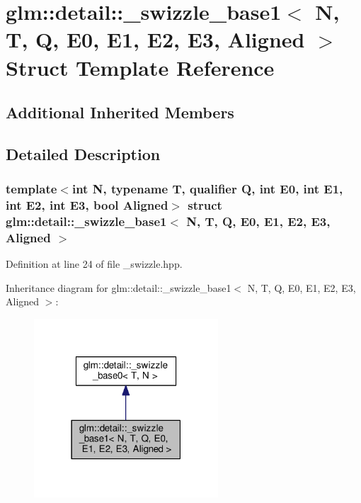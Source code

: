 \hypertarget{structglm_1_1detail_1_1__swizzle__base1}{}\section{glm\+:\+:detail\+:\+:\+\_\+swizzle\+\_\+base1$<$ N, T, Q, E0, E1, E2, E3, Aligned $>$ Struct Template Reference}
\label{structglm_1_1detail_1_1__swizzle__base1}
\subsection*{Additional Inherited Members}


\subsection{Detailed Description}
\subsubsection*{template$<$int N, typename T, qualifier Q, int E0, int E1, int E2, int E3, bool Aligned$>$\newline
struct glm\+::detail\+::\+\_\+swizzle\+\_\+base1$<$ N, T, Q, E0, E1, E2, E3, Aligned $>$}



Definition at line 24 of file \+\_\+swizzle.\+hpp.



Inheritance diagram for glm\+:\+:detail\+:\+:\+\_\+swizzle\+\_\+base1$<$ N, T, Q, E0, E1, E2, E3, Aligned $>$\+:
\nopagebreak
\begin{figure}[H]
\begin{center}
\leavevmode
\includegraphics[width=195pt]{d8/dbf/structglm_1_1detail_1_1__swizzle__base1__inherit__graph}
\end{center}
\end{figure}


